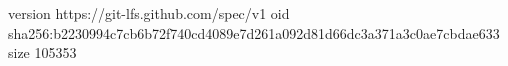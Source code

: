 version https://git-lfs.github.com/spec/v1
oid sha256:b2230994c7cb6b72f740cd4089e7d261a092d81d66dc3a371a3c0ae7cbdae633
size 105353

